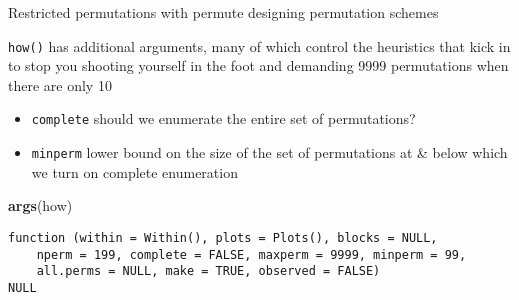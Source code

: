 \documentclass[10pt,ignorenonframetext,compress, aspectratio=169]{beamer}
\newenvironment{Shaded}{\begin{snugshade}}{\end{snugshade}}
\newcommand{\KeywordTok}[1]{\textcolor[rgb]{0.13,0.29,0.53}{\textbf{{#1}}}}
\newcommand{\NormalTok}[1]{{#1}}
\begin{document}
\begin{frame}[fragile]{Restricted permutations with permute \textbar{}
designing permutation schemes}

\texttt{how()} has additional arguments, many of which control the
heuristics that kick in to stop you shooting yourself in the foot and
demanding 9999 permutations when there are only 10

\begin{itemize}
\itemsep1pt\parskip0pt
\item
  \texttt{complete} should we enumerate the entire set of permutations?
\item
  \texttt{minperm} lower bound on the size of the set of permutations at
  \& below which we turn on complete enumeration
\end{itemize}

\scriptsize

\begin{Shaded}
\begin{Highlighting}[]
\KeywordTok{args}\NormalTok{(how)}
\end{Highlighting}
\end{Shaded}

\begin{verbatim}
function (within = Within(), plots = Plots(), blocks = NULL, 
    nperm = 199, complete = FALSE, maxperm = 9999, minperm = 99, 
    all.perms = NULL, make = TRUE, observed = FALSE) 
NULL
\end{verbatim}

\normalsize

\end{frame}
\end{document}
